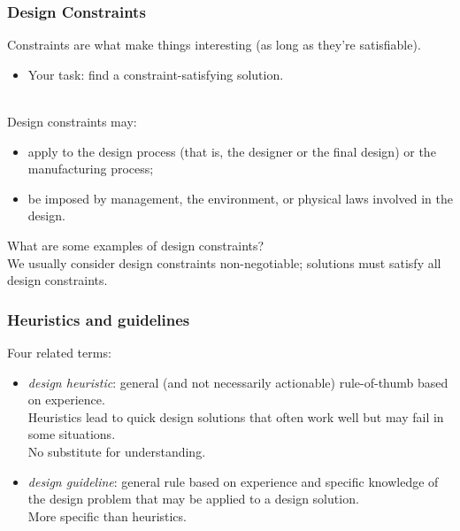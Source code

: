 \begin{frame}
\frametitle{Design Constraints}

\begin{changemargin}{1.5cm}
Constraints are what make things interesting
(as long as they're satisfiable). 
\begin{itemize}
\item Your task: find a constraint-satisfying
solution.
\end{itemize}
~\\

Design constraints may:
\begin{itemize}
\item apply to the design process (that is, the
designer or the final design) or the manufacturing process; 
\item be imposed by management, the environment, or physical laws involved
in the design.
\end{itemize}

\alert{What are some examples of design constraints?}\\[1em]

We usually consider design constraints non-negotiable; solutions must
satisfy all design constraints.
\end{changemargin}

\end{frame}

\begin{frame}
\frametitle{Heuristics and guidelines}

\begin{changemargin}{1.5cm}
Four related terms:
\begin{itemize}
\item \emph{design heuristic}: general (and not necessarily
actionable) rule-of-thumb based on experience.  \\[1em]

Heuristics lead to
quick design solutions that often work well but may fail in some
situations. \\[1em]

No substitute for understanding.\\[1em]

\item \emph{design guideline}: general rule based on experience and
specific knowledge of the design problem that may be applied to a design
solution. \\[1em]

More specific than heuristics.
\end{itemize}
\end{changemargin}

\end{frame}


